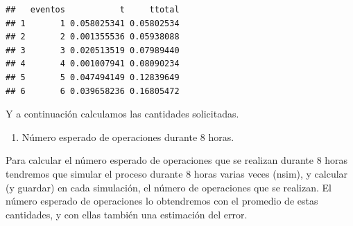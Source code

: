\documentclass[
]{book}
\newenvironment{Shaded}{\begin{snugshade}}{\end{snugshade}}
\newcommand{\AttributeTok}[1]{\textcolor[rgb]{0.77,0.63,0.00}{#1}}
\newcommand{\CommentTok}[1]{\textcolor[rgb]{0.56,0.35,0.01}{\textit{#1}}}
\newcommand{\ControlFlowTok}[1]{\textcolor[rgb]{0.13,0.29,0.53}{\textbf{#1}}}
\newcommand{\DecValTok}[1]{\textcolor[rgb]{0.00,0.00,0.81}{#1}}
\newcommand{\FunctionTok}[1]{\textcolor[rgb]{0.00,0.00,0.00}{#1}}
\newcommand{\NormalTok}[1]{#1}
\newcommand{\OtherTok}[1]{\textcolor[rgb]{0.56,0.35,0.01}{#1}}
\newcommand{\SpecialCharTok}[1]{\textcolor[rgb]{0.00,0.00,0.00}{#1}}
\newcommand{\StringTok}[1]{\textcolor[rgb]{0.31,0.60,0.02}{#1}}
\providecommand{\tightlist}{%
  \setlength{\itemsep}{0pt}\setlength{\parskip}{0pt}}
\theoremstyle{definition}
\theoremstyle{definition}
\theoremstyle{definition}
\theoremstyle{definition}
\theoremstyle{remark}
\begin{document}
\begin{verbatim}
##   eventos           t     ttotal
## 1       1 0.058025341 0.05802534
## 2       2 0.001355536 0.05938088
## 3       3 0.020513519 0.07989440
## 4       4 0.001007941 0.08090234
## 5       5 0.047494149 0.12839649
## 6       6 0.039658236 0.16805472
\end{verbatim}

Y a continuación calculamos las cantidades solicitadas.

\begin{enumerate}
\def\labelenumi{\arabic{enumi}.}
\tightlist
\item
  Número esperado de operaciones durante 8 horas.
\end{enumerate}

Para calcular el número esperado de operaciones que se realizan durante 8 horas tendremos que simular el proceso durante 8 horas varias veces (nsim), y calcular (y guardar) en cada simulación, el número de operaciones que se realizan. El número esperado de operaciones lo obtendremos con el promedio de estas cantidades, y con ellas también una estimación del error.

\begin{Shaded}
\end{Shaded}
\end{document}
